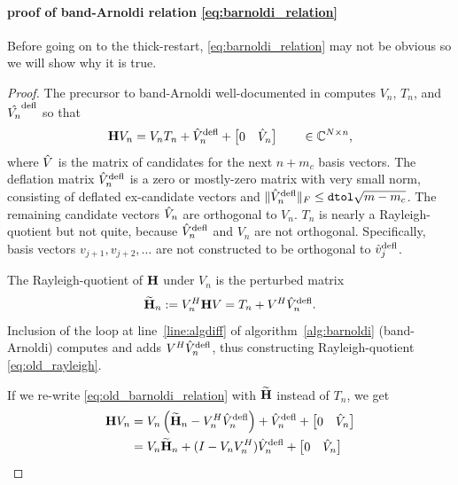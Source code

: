 \paragraph{proof of band-Arnoldi relation \eqref{eq:barnoldi_relation}}
Before going on to the thick-restart, \eqref{eq:barnoldi_relation} may not be obvious so we will show why it is true.  
\begin{proof} 
The precursor to band-Arnoldi well-documented in \cite{freund2000b,AliagaMIMO} computes $V_n$, $T_n$, and $\hat{V_n}^{\text{defl}}$ so that 
\begin{equation}
\textbf{\textup{H}} V_n = V_n T_n + \hat{V}_n^{\text{defl}} + \begin{bmatrix} 0&\hat{V}_n\end{bmatrix} \qquad \in\mathbb{C}^{N \times n },
\label{eq:old_barnoldi_relation}
\end{equation}
 where $\hat{V}$ is the matrix of candidates for the next $n+m_c$ basis vectors.  The deflation matrix $\hat{V}_n^{\text{defl}}$ is a zero or mostly-zero matrix with very small norm, consisting of deflated ex-candidate vectors and   $\| \hat{V}_n^{\text{defl}}\|_F \leq \texttt{dtol}\sqrt{m-m_c}$.  The remaining candidate vectors $\hat{V}_n$ are orthogonal to $V_n$. $T_n$ is nearly a Rayleigh-quotient but not quite, because $\hat{V}_n^{\text{defl}}$ and $V_n$ are not orthogonal.  Specifically, basis vectors $v_{j+1},v_{j+2},\ldots$ are not constructed to be orthogonal to $\hat{v}_j^{\text{defl}}$.   

The Rayleigh-quotient of $\textbf{\textup{H}}$ under $V_n$ is the perturbed matrix 
\begin{equation}
\widetilde{\textbf{\textup{H}}}_n := V_n^H \textbf{\textup{H}} V = T_n  + V^H\hat{V}_n^{\text{defl}}.
\label{eq:old_rayleigh}
\end{equation}
Inclusion of the loop at line~\eqref{line:algdiff} of algorithm~\ref{alg:barnoldi} (band-Arnoldi) computes and adds $V^H\hat{V}_n^{\text{defl}}$, thus constructing  Rayleigh-quotient \eqref{eq:old_rayleigh}.

If we re-write \eqref{eq:old_barnoldi_relation} with $\widetilde{\textbf{\textup{H}}}$ instead of $T_n$, we get
\begin{align}
\textbf{\textup{H}} V_n &= V_n \left( \widetilde{\textbf{\textup{H}}}_n -  V_n^H\hat{V}_n^{\text{defl}} \right) + \hat{V}_n^{\text{defl}} + \begin{bmatrix} 0&\hat{V}_n\end{bmatrix} \\
&= V_n \widetilde{\textbf{\textup{H}}}_n + (I-V_nV_n^H)\hat{V}_n^{\text{defl}}  + \begin{bmatrix} 0&\hat{V}_n\end{bmatrix}
\end{align}

\end{proof} 





